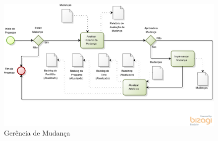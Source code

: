 \begin{figure}[H]
    \centering
	\includegraphics[keepaspectratio=true,scale=0.5]{figuras/gerencia.eps}
    \caption{Gerência de Mudança}
    \label{fig:processo}
\end{figure}